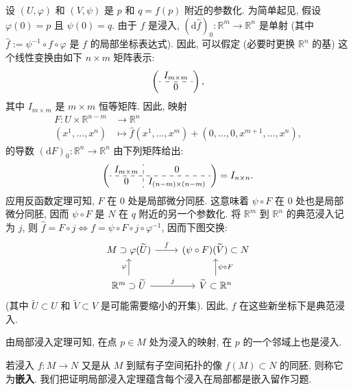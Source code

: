 \begin{RiemannProof}
设 $(U,\varphi)$ 和 $(V,\psi)$ 是 $p$ 和 $q=f(p)$ 附近的参数化. 为简单起见, 假设 $\varphi(0)=p$ 且 $\psi(0)=q$. 由于 $f$ 是浸入, $(\mathrm{d}\widehat f)_0:\mathbb{R}^m\to\mathbb{R}^n$ 是单射 (其中 $\widehat f:=\psi^{-1}\circ f\circ\varphi$ 是 $f$ 的局部坐标表达式). 因此, 可以假定 (必要时更换 $\mathbb{R}^n$ 的基) 这个线性变换由如下 $n\times m$ 矩阵表示:
\[
  \left(\begin{array}{c} I_{m\times m}\\ \hdashline 0\end{array}\right),
\]
其中 $I_{m\times m}$ 是 $m\times m$ 恒等矩阵. 因此, 映射
\begin{align*}
  F:U\times\mathbb{R}^{n-m}&\to\mathbb{R}^n\\
  (x^1,\ldots,x^n)&\mapsto
  \widehat f(x^1,\ldots,x^m)+(0,\ldots,0,x^{m+1},\ldots,x^n),
\end{align*}
的导数 $(\mathrm{d}F)_0:\mathbb{R}^n\to\mathbb{R}^n$ 由下列矩阵给出:
\[
  \left(\begin{array}{c:c}
  I_{m\times m}&0\\ \hdashline
  0&I_{(n-m)\times(n-m)}
  \end{array}\right)=I_{n\times n}.
\]
应用反函数定理可知, $F$ 在 $0$ 处是局部微分同胚. 这意味着 $\psi\circ F$ 在 $0$ 处也是局部微分同胚, 因而 $\psi\circ F$ 是 $N$ 在 $q$ 附近的另一个参数化. 将 $\mathbb{R}^m$ 到 $\mathbb{R}^n$ 的典范浸入记为 $j$, 则 $\widehat f=F\circ j\Leftrightarrow f=\psi\circ F\circ j\circ\varphi^{-1}$, 因而下图交换:
\[
  \begin{tikzcd}[ampersand replacement=\&]
    M\supset\varphi(\widetilde U) \arrow[r,"f"] \& (\psi\circ F)(\widetilde V)\subset N\\
    \mathbb{R}^m\supset\widetilde U \arrow[u,"\varphi"] \arrow[r,"j"] \&
    \widetilde V\subset\mathbb{R}^n \arrow[u,"\psi\circ F"']
  \end{tikzcd}
\]
(其中 $\widetilde U\subset U$ 和 $\widetilde V\subset V$ 是可能需要缩小的开集). 因此, $f$ 在这些新坐标下是典范浸入.
\end{RiemannProof}

\begin{RiemannRemark}\label{rem:immersion-on-neighborhood}
由局部浸入定理可知, 在点 $p\in M$ 处为浸入的映射, 在 $p$ 的一个邻域上也是浸入.
\end{RiemannRemark}

若浸入 $f:M\to N$ 又是从 $M$ 到赋有子空间拓扑的像 $f(M)\subset N$ 的同胚, 则称它为\textbf{嵌入}. 我们把证明局部浸入定理蕴含每个浸入在局部都是嵌入留作习题.

